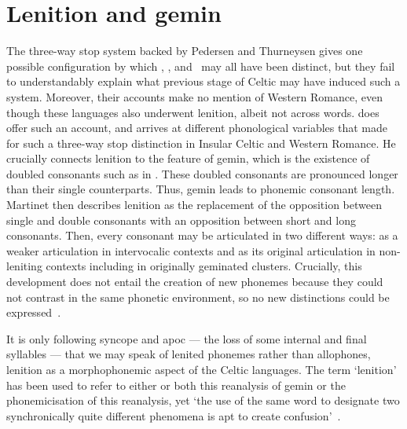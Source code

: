 \section{Lenition and \gls{gemin}}
\label{sec:martinet}
The three-way stop system backed by Pedersen and Thurneysen gives one possible configuration by which \xT, \lT, and \xD\ may all have been distinct, but they fail to understandably explain what previous stage of Celtic may have induced such a system. Moreover, their accounts make no mention of Western Romance, even though these languages also underwent lenition, albeit not across words.  \Textcite{martinet_celtic_1952} does offer such an account, and arrives at different phonological variables that made for such a three-way stop distinction in Insular Celtic and Western Romance.
He crucially connects lenition to the feature of \gls{gemin}, which is the existence of doubled consonants such as  in . These doubled consonants are pronounced longer than their single counterparts. Thus, \gls{gemin} leads to phonemic consonant length. Martinet then describes lenition as the replacement of the opposition between single and double consonants with an opposition between short and long consonants. Then, every consonant may be articulated in two different ways: as a weaker articulation in intervocalic contexts and as its original articulation in non-leniting contexts including in originally geminated clusters. Crucially, this development does not entail the creation of new phonemes because they could not contrast in the same phonetic environment, so no new distinctions could be expressed~\autocite[192]{martinet_celtic_1952}.

It is only following syncope and \gls{apoc} — the loss of some internal and final syllables — that we may speak of lenited phonemes rather than allophones, \ie lenition as a morphophonemic aspect of the Celtic languages. The term `lenition' has been used to refer to either or both this reanalysis of \gls{gemin} or the phonemicisation of this reanalysis, yet `the use of the same word to designate two synchronically quite different phenomena is apt to create confusion'~\autocite[193–194]{martinet_celtic_1952}.

